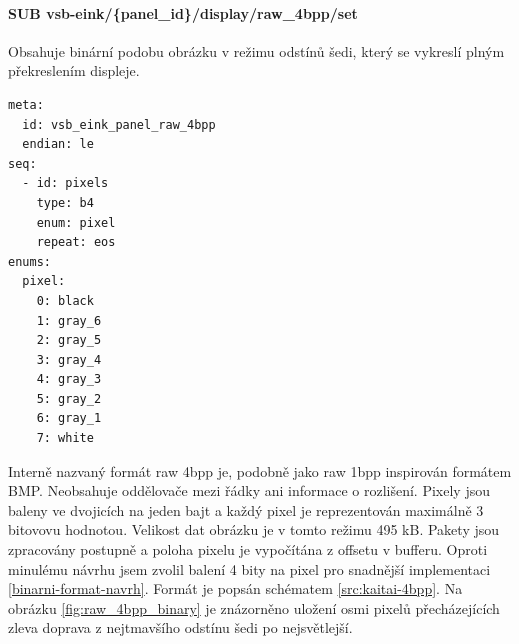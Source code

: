 \paragraph*{SUB vsb-eink/\{panel\_id\}/display/raw\_4bpp/set}
Obsahuje binární podobu obrázku v režimu odstínů šedi, který se vykreslí plným překreslením displeje.

\begin{lstlisting}[label=src:kaitai-4bpp,caption={Kaitai schéma formátu raw 4bpp}]
meta:
  id: vsb_eink_panel_raw_4bpp
  endian: le
seq:
  - id: pixels
    type: b4
    enum: pixel
    repeat: eos
enums:
  pixel:
    0: black
    1: gray_6
    2: gray_5
    3: gray_4
    4: gray_3
    5: gray_2
    6: gray_1
    7: white
\end{lstlisting}

Interně nazvaný formát raw 4bpp je, podobně jako raw 1bpp inspirován formátem BMP. Neobsahuje oddělovače mezi řádky ani informace o rozlišení. Pixely jsou baleny ve dvojicích na jeden bajt a každý pixel je reprezentován maximálně 3 bitovovu hodnotou. Velikost dat obrázku je v tomto režimu 495 kB. Pakety jsou zpracovány postupně a poloha pixelu je vypočítána z offsetu v bufferu. Oproti minulému návrhu jsem zvolil balení 4 bity na pixel pro snadnější implementaci \ref{binarni-format-navrh}. Formát je popsán schématem \ref{src:kaitai-4bpp}. Na obrázku \ref{fig:raw_4bpp_binary} je znázorněno uložení osmi pixelů přecházejících zleva doprava z nejtmavšího odstínu šedi po nejsvětlejší.

